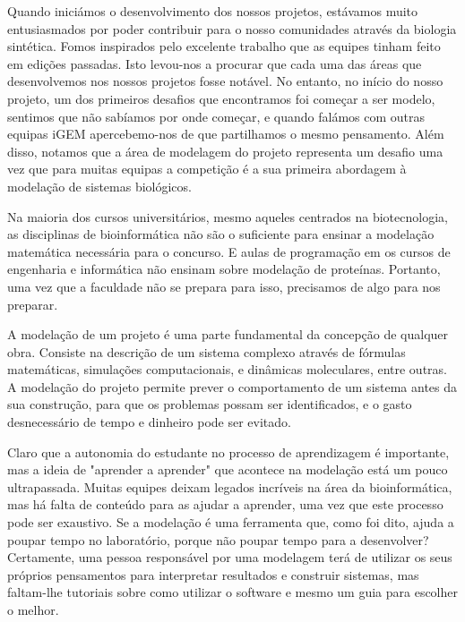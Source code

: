 \documentclass[11pt, letterpaper, portuguese]{article}
\begin{document}
\par{Quando iniciámos o desenvolvimento dos nossos projetos, estávamos muito entusiasmados por poder contribuir para o nosso comunidades através da biologia sintética. Fomos inspirados pelo excelente trabalho que as equipes tinham feito em edições passadas. Isto levou-nos a procurar que cada uma das áreas que desenvolvemos nos nossos projetos fosse notável.
No entanto, no início do nosso projeto, um dos primeiros desafios que encontramos foi começar a ser modelo, sentimos que não sabíamos por onde começar, e quando falámos com outras equipas iGEM apercebemo-nos de que partilhamos o mesmo pensamento. Além disso, notamos que a área de modelagem do projeto representa um desafio uma vez que para muitas equipas a competição é a sua primeira abordagem à modelação de sistemas biológicos.
} 

\par Na maioria dos cursos universitários, mesmo aqueles centrados na biotecnologia, as disciplinas de bioinformática não são o suficiente para ensinar a modelação matemática necessária para o concurso. E aulas de programação em os cursos de engenharia e informática não ensinam sobre modelação de proteínas. Portanto, uma vez que a faculdade não se prepara para isso, precisamos de algo para nos preparar.

\par{A modelação de um projeto é uma parte fundamental da concepção de qualquer obra. Consiste na descrição de um sistema complexo através de fórmulas matemáticas, simulações computacionais, e dinâmicas moleculares, entre outras. A modelação do projeto permite prever o comportamento de um sistema antes da sua construção, para que os problemas possam ser identificados, e o gasto desnecessário de tempo e dinheiro pode ser evitado.}

\par Claro que a autonomia do estudante no processo de aprendizagem é importante, mas a ideia de "aprender a aprender" que acontece na modelação está um pouco ultrapassada. Muitas equipes deixam legados incríveis na área da bioinformática, mas há falta de conteúdo para as ajudar a aprender, uma vez que este processo pode ser exaustivo. Se a modelação é uma ferramenta que, como foi dito, ajuda a poupar tempo no laboratório, porque não poupar tempo para a desenvolver? Certamente, uma pessoa responsável por uma modelagem terá de utilizar os seus próprios pensamentos para interpretar resultados e construir sistemas, mas faltam-lhe tutoriais sobre como utilizar o software e mesmo um guia para escolher o melhor.
\end{document}
